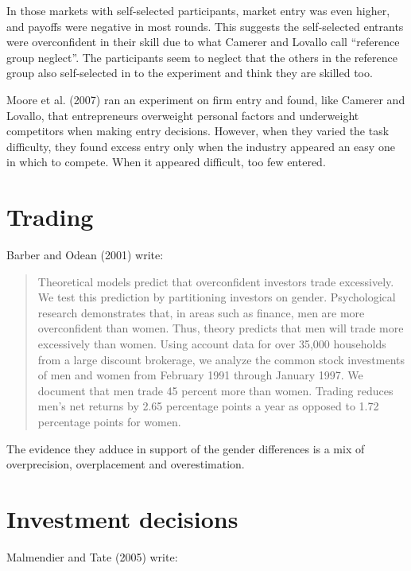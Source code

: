 \documentclass[
  letterpaper,
  DIV=11,
  numbers=noendperiod]{scrreprt}
\begin{document}
In those markets with self-selected participants, market entry was even
higher, and payoffs were negative in most rounds. This suggests the
self-selected entrants were overconfident in their skill due to what
Camerer and Lovallo call ``reference group neglect''. The participants
seem to neglect that the others in the reference group also
self-selected in to the experiment and think they are skilled too.

Moore et al. (2007) ran an experiment on firm entry and found, like
Camerer and Lovallo, that entrepreneurs overweight personal factors and
underweight competitors when making entry decisions. However, when they
varied the task difficulty, they found excess entry only when the
industry appeared an easy one in which to compete. When it appeared
difficult, too few entered.

\hypertarget{trading}{%
\section{Trading}\label{trading}}

Barber and Odean (2001) write:

\begin{quote}
Theoretical models predict that overconfident investors trade
excessively. We test this prediction by partitioning investors on
gender. Psychological research demonstrates that, in areas such as
finance, men are more overconfident than women. Thus, theory predicts
that men will trade more excessively than women. Using account data for
over 35,000 households from a large discount brokerage, we analyze the
common stock investments of men and women from February 1991 through
January 1997. We document that men trade 45 percent more than women.
Trading reduces men's net returns by 2.65 percentage points a year as
opposed to 1.72 percentage points for women.
\end{quote}

The evidence they adduce in support of the gender differences is a mix
of overprecision, overplacement and overestimation.

\hypertarget{investment-decisions}{%
\section{Investment decisions}\label{investment-decisions}}

Malmendier and Tate (2005) write:
\end{document}
